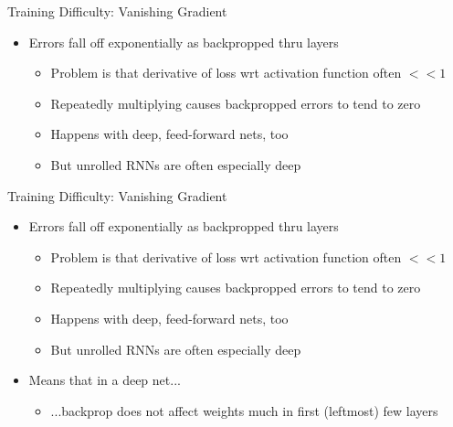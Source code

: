 \documentclass[aspectratio=169]{beamer}
\begin{document}
\begin{frame}{Training Difficulty: Vanishing Gradient}

\begin{itemize}
	\item Errors fall off exponentially as backpropped thru layers	
	\begin{itemize}
		\item Problem is that derivative of loss wrt activation function often $<< 1$
		\item Repeatedly multiplying causes backpropped errors to tend to zero
		\item Happens with deep, feed-forward nets, too 
		\item But unrolled RNNs are often especially deep
	\end{itemize}
\end{itemize}

\end{frame}
\begin{frame}{Training Difficulty: Vanishing Gradient}

\begin{itemize}
	\item Errors fall off exponentially as backpropped thru layers	
	\begin{itemize}
		\item Problem is that derivative of loss wrt activation function often $<< 1$
		\item Repeatedly multiplying causes backpropped errors to tend to zero
		\item Happens with deep, feed-forward nets, too 
		\item But unrolled RNNs are often especially deep
	\end{itemize}
	\item Means that in a deep net...
	\begin{itemize}
	\item ...backprop does not affect weights much in first (leftmost) few layers
	\end{itemize}
\end{itemize}

\end{frame}
\end{document}
